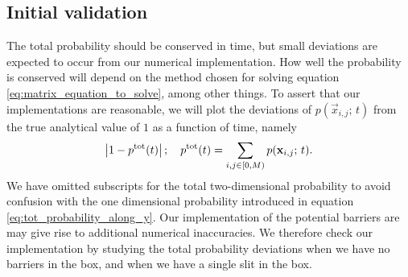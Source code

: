     \subsection{Initial validation}\label{sec:methods:sanity}

        The total probability should be conserved in time, but small deviations are expected to occur from our numerical implementation. How well the probability is conserved will depend on the method chosen for solving equation \eqref{eq:matrix_equation_to_solve}, among other things. To assert that our implementations are reasonable, we will plot the deviations of $p(\vec{x}_{i,j}; \, t)$ from the true analytical value of $1$ as a function of time, namely  
        \begin{equation}\label{eq:total_probability_deviation}
            \abs{1- p^\mathrm{tot}(t)}\,; \quad p^\mathrm{tot}(t) = \sum_{i,j\in [0, M)} p(\mathbf{x}_{i,j};\, t).
        \end{equation}
        We have omitted subscripts for the total two-dimensional probability to avoid confusion with the one dimensional probability introduced in equation \eqref{eq:tot_probability_along_y}. Our implementation of the potential barriers are may give rise to additional numerical inaccuracies. We therefore check our implementation by studying the total probability deviations when we have no barriers in the box, and when we have a single slit in the box.  

